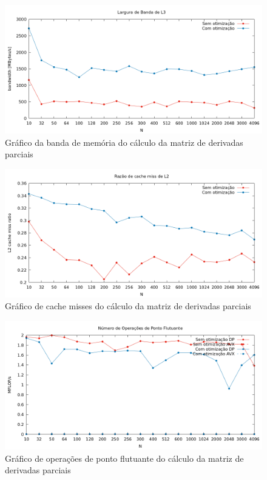 \documentclass{article}
\begin{document}
\begin{figure}[htp]
    \centering
    \includegraphics[width=12cm]{l3_derivadas.png}
    \caption{Gráfico da banda de memória do cálculo da matriz de derivadas parciais}
    \label{fig:l3_derivadas}
\end{figure}

\begin{figure}[htp]
    \centering
    \includegraphics[width=12cm]{l2cache_derivadas.png}
    \caption{Gráfico de cache misses do cálculo da matriz de derivadas parciais}
    \label{fig:l2_derivadas}
\end{figure}

\begin{figure}[htp]
    \centering
    \includegraphics[width=12cm]{flops_dp_derivadas.png}
    \caption{Gráfico de operações de ponto flutuante do cálculo da matriz de derivadas parciais}
    \label{fig:flops_derivadas}
\end{figure}
\end{document}
